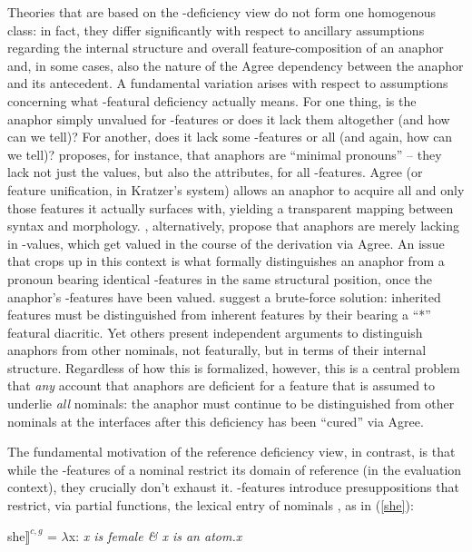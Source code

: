 \documentclass[output=paper, modfonts, nonflat]{langsci/langscibook}
\begin{document}
  Theories that are based on the \ph-deficiency view do not form one
  homogenous class: in fact, they differ significantly with respect to
  ancillary assumptions regarding the internal structure and overall
  feature-composition of an anaphor and, in some cases, also the
  nature of the Agree dependency between the anaphor and its
  antecedent. A fundamental variation arises with respect to
  assumptions concerning what \ph-featural deficiency actually
  means. For one thing, is the anaphor simply unvalued for
  \ph-features or does it lack them altogether (and how can we tell)?
  For another, does it lack some \ph-features or all (and again, how
  can we tell)?  \citet{kratzer:2009} proposes, for instance, that
  anaphors are ``minimal pronouns'' -- they lack not just the values,
  but also the attributes, for all \ph-features. Agree (or feature
  unification, in Kratzer's system) allows an anaphor to acquire all
  and only those features it actually surfaces with, yielding a
  transparent mapping between syntax and
  morphology. \citet{roorwyn:2011}, alternatively, propose that
  anaphors are merely lacking in \ph-values, which get valued in the
  course of the derivation via Agree. An issue that crops up in this
  context is what formally distinguishes an anaphor from a pronoun
  bearing identical \ph-features in the same structural position, once
  the anaphor's \ph-features have been valued. \citeauthor{roorwyn:2011}
  suggest a brute-force solution: inherited features must be
  distinguished from inherent features by their bearing a ``*''
  featural diacritic. Yet others \citep{heinat:2008,reuland:2001,
    Reuland:2011, dechainewiltschko:2012} present independent
  arguments to distinguish anaphors from other nominals, not
  featurally, but in terms of their internal structure. Regardless of
  how this is formalized, however, this is a central problem that
  \textit{any} account that anaphors are deficient for a feature that is
  assumed to underlie \textit{all} nominals: the anaphor must continue
  to be distinguished from other nominals at the interfaces after this
  deficiency has been ``cured'' via Agree.\largerpage

  The fundamental motivation of the reference deficiency view, in
  contrast, is that while the \ph-features of a nominal restrict its
  domain of reference (in the evaluation context), they crucially
  don't exhaust it. \ph-features introduce presuppositions that
  restrict, via partial functions, the lexical entry of nominals
  \citep{heimkratzer:1998}, as in (\ref{she}):
\begin{exe}  
\ex {$\llbracket$}she$\rrbracket^{c,g}$ = $\lambda$x: \textit{x is female \& x is an atom.x} \label{she}
\end{exe}
\end{document}
